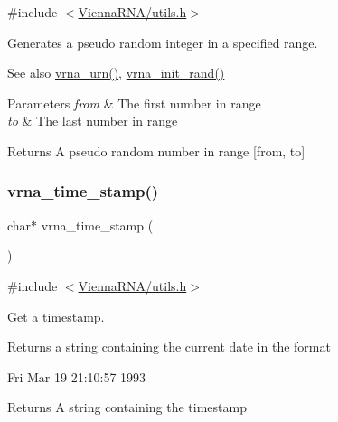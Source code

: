 {\ttfamily \#include $<$\mbox{\hyperlink{utils_8h}{Vienna\+R\+N\+A/utils.\+h}}$>$}



Generates a pseudo random integer in a specified range. 

\begin{DoxySeeAlso}{See also}
\mbox{\hyperlink{group__utils_ga384e256ebb295d04a14426179db0dd6e}{vrna\+\_\+urn()}}, \mbox{\hyperlink{group__utils_ga0ad1f40ea316e5c5918695c35613027a}{vrna\+\_\+init\+\_\+rand()}} 
\end{DoxySeeAlso}

\begin{DoxyParams}{Parameters}
{\em from} & The first number in range \\
\hline
{\em to} & The last number in range \\
\hline
\end{DoxyParams}
\begin{DoxyReturn}{Returns}
A pseudo random number in range \mbox{[}from, to\mbox{]} 
\end{DoxyReturn}
\mbox{\label{group__utils_gad3bbe8d01afb1310609cb018d5290550}} 
\subsubsection{\texorpdfstring{vrna\+\_\+time\+\_\+stamp()}{vrna\_time\_stamp()}}
{\footnotesize\ttfamily char$\ast$ vrna\+\_\+time\+\_\+stamp (\begin{DoxyParamCaption}\item[{void}]{ }\end{DoxyParamCaption})}



{\ttfamily \#include $<$\mbox{\hyperlink{utils_8h}{Vienna\+R\+N\+A/utils.\+h}}$>$}



Get a timestamp. 

Returns a string containing the current date in the format \begin{DoxyVerb}Fri Mar 19 21:10:57 1993 \end{DoxyVerb}


\begin{DoxyReturn}{Returns}
A string containing the timestamp 
\end{DoxyReturn}
\mbox{\label{group__utils_ga8ef1835eb83f542396f59f0b205965e5}} 
